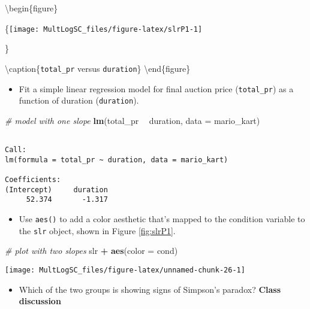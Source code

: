 \documentclass[
]{book}
\newenvironment{Shaded}{\begin{snugshade}}{\end{snugshade}}
\newcommand{\CommentTok}[1]{\textcolor[rgb]{0.56,0.35,0.01}{\textit{#1}}}
\newcommand{\DataTypeTok}[1]{\textcolor[rgb]{0.13,0.29,0.53}{#1}}
\newcommand{\KeywordTok}[1]{\textcolor[rgb]{0.13,0.29,0.53}{\textbf{#1}}}
\newcommand{\NormalTok}[1]{#1}
\newcommand{\OperatorTok}[1]{\textcolor[rgb]{0.81,0.36,0.00}{\textbf{#1}}}
\newcommand{\StringTok}[1]{\textcolor[rgb]{0.31,0.60,0.02}{#1}}
\providecommand{\tightlist}{%
  \setlength{\itemsep}{0pt}\setlength{\parskip}{0pt}}
\begin{document}
\textbackslash begin\{figure\}

\{\centering \texttt{[image: MultLogSC\_files/figure-latex/slrP1-1]}

\}

\textbackslash caption\{\texttt{total\_pr} versus \texttt{duration}\}\label{fig:slrP1}
\textbackslash end\{figure\}

\begin{itemize}
\tightlist
\item
  Fit a simple linear regression model for final auction price (\texttt{total\_pr}) as a function of duration (\texttt{duration}).
\end{itemize}

\begin{Shaded}
\begin{Highlighting}[]
\CommentTok{# model with one slope}
\KeywordTok{lm}\NormalTok{(total_pr }\OperatorTok{~}\StringTok{ }\NormalTok{duration, }\DataTypeTok{data =}\NormalTok{ mario_kart)}
\end{Highlighting}
\end{Shaded}

\begin{verbatim}

Call:
lm(formula = total_pr ~ duration, data = mario_kart)

Coefficients:
(Intercept)     duration  
     52.374       -1.317  
\end{verbatim}

\begin{itemize}
\tightlist
\item
  Use \texttt{aes()} to add a color aesthetic that's mapped to the condition variable to the \texttt{slr} object, shown in Figure \ref{fig:slrP1}.
\end{itemize}

\begin{Shaded}
\begin{Highlighting}[]
\CommentTok{# plot with two slopes}
\NormalTok{slr }\OperatorTok{+}\StringTok{ }\KeywordTok{aes}\NormalTok{(}\DataTypeTok{color =}\NormalTok{ cond)}
\end{Highlighting}
\end{Shaded}

\begin{center}\texttt{[image: MultLogSC\_files/figure-latex/unnamed-chunk-26-1]} \end{center}

\begin{itemize}
\tightlist
\item
  Which of the two groups is showing signs of Simpson's paradox? \textbf{Class discussion}
\end{itemize}
\end{document}
